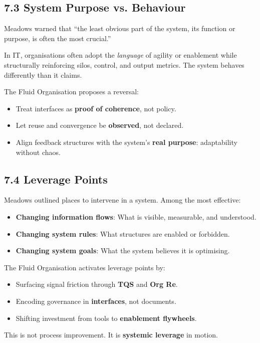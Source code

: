 \documentclass[12pt]{article}
\begin{document}
\subsection*{7.3 System Purpose vs. Behaviour}

Meadows warned that “the least obvious part of the system, its function or purpose, is often the most crucial.”

In IT, organisations often adopt the \textit{language} of agility or enablement while structurally reinforcing silos, control, and output metrics. The system behaves differently than it claims.

The Fluid Organisation proposes a reversal:
\begin{itemize}
    \item Treat interfaces as \textbf{proof of coherence}, not policy.
    \item Let reuse and convergence be \textbf{observed}, not declared.
    \item Align feedback structures with the system’s \textbf{real purpose}: adaptability without chaos.
\end{itemize}

\subsection*{7.4 Leverage Points}

Meadows outlined places to intervene in a system. Among the most effective:
\begin{itemize}
    \item \textbf{Changing information flows}: What is visible, measurable, and understood.
    \item \textbf{Changing system rules}: What structures are enabled or forbidden.
    \item \textbf{Changing system goals}: What the system believes it is optimising.
\end{itemize}

The Fluid Organisation activates leverage points by:
\begin{itemize}
    \item Surfacing signal friction through \textbf{TQS} and \textbf{Org Re}.
    \item Encoding governance in \textbf{interfaces}, not documents.
    \item Shifting investment from tools to \textbf{enablement flywheels}.
\end{itemize}

This is not process improvement. It is \textbf{systemic leverage} in motion.
\end{document}
